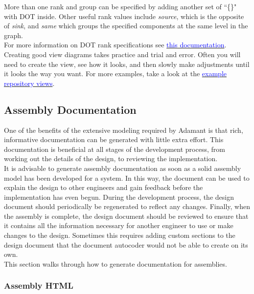 More than one rank and group can be specified by adding another set of ``\{\}" with DOT inside. Other useful rank values include \textit{source}, which is the opposite of \textit{sink}, and \textit{same} which groups the specified components at the same level in the graph. \\

For more information on DOT rank specifications see \href{https://www.graphviz.org/doc/info/attrs.html#d:rank}{\textcolor{blue}{this documentation}}. \\

Creating good view diagrams takes practice and trial and error. Often you will need to create the view, see how it looks, and then slowly make adjustments until it looks the way you want. For more examples, take a look at the \href{https://github.com/lasp/adamant_example/tree/main/src/assembly/linux/views}{\textcolor{blue}{example repository views}}.

\subsection{Assembly Documentation} \label{Assembly Documentation}

One of the benefits of the extensive modeling required by Adamant is that rich, informative documentation can be generated with little extra effort. This documentation is beneficial at all stages of the development process, from working out the details of the design, to reviewing the implementation. \\

It is advisable to generate assembly documentation as soon as a solid assembly model has been developed for a system. In this way, the document can be used to explain the design to other engineers and gain feedback before the implementation has even begun. During the development process, the design document should periodically be regenerated to reflect any changes. Finally, when the assembly is complete, the design document should be reviewed to ensure that it contains all the information necessary for another engineer to use or make changes to the design. Sometimes this requires adding custom sections to the design document that the document autocoder would not be able to create on its own. \\

This section walks through how to generate documentation for assemblies.

\subsubsection{Assembly HTML}


